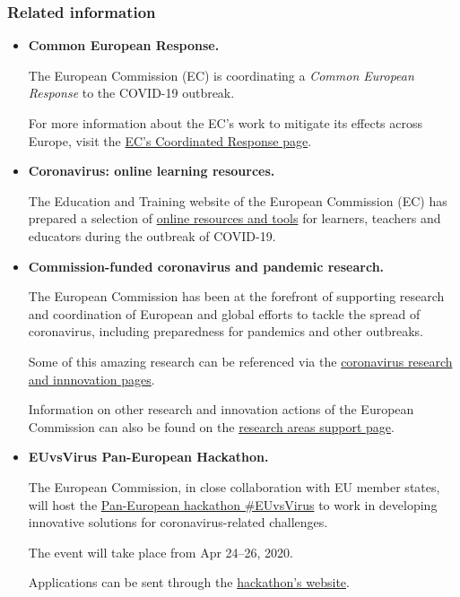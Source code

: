 \documentclass[oneside]{book}
\numberwithin{equation}{section}
\begin{document}
\subsubsection{Related information}
\begin{itemize}
    \item \textbf{Common European Response.}
    
    The European Commission (EC) is coordinating a \textit{Common European Response} to the COVID-19 outbreak.
    
    For more information about the EC's work to mitigate its effects across Europe, visit the \href{https://ec.europa.eu/info/live-work-travel-eu/health/coronavirus-response_en}{EC's Coordinated Response page}.
    \item \textbf{Coronavirus: online learning resources.}
    
    The Education and Training website of the European Commission (EC) has prepared a selection of \href{https://ec.europa.eu/education/resources-and-tools/coronavirus-online-learning-resources_en}{online resources and tools} for learners, teachers and educators during the outbreak of COVID-19.
    \item \textbf{Commission-funded coronavirus and pandemic research.}
    
    The European Commission has been at the forefront of supporting research and coordination of European and global efforts to tackle the spread of coronavirus, including preparedness for pandemics and other outbreaks.
    
    Some of this amazing research can be referenced via the \href{https://ec.europa.eu/info/research-and-innovation/research-area/health-research-and-innovation/coronavirus-research-and-innovation\_en}{coronavirus research and innnovation pages}.
    
    Information on other research and innovation actions of the European Commission can also be found on the \href{https://ec.europa.eu/info/research-and-innovation/research-area/}{research areas support page}.
    \item \textbf{EUvsVirus Pan-European Hackathon.}
    
    The European Commission, in close collaboration with EU member states, will host the \href{https://ec.europa.eu/research/mariecurieactions/news/commission-launches-euvirus-hackathon_en}{Pan-European hackathon \#EUvsVirus} to work in developing innovative solutions for coronavirus-related challenges.
    
    The event will take place from Apr 24--26, 2020.
    
    Applications can be sent through the \href{https://euvsvirus.org/}{hackathon's website}.
\end{itemize}
\end{document}
